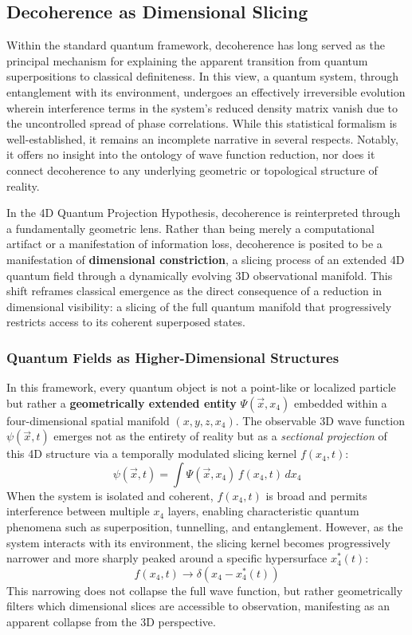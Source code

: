 \documentclass[12pt]{article}
\begin{document}
\subsection{Decoherence as Dimensional Slicing}

Within the standard quantum framework, decoherence has long served as the principal mechanism for explaining the apparent transition from quantum superpositions to classical definiteness. In this view, a quantum system, through entanglement with its environment, undergoes an effectively irreversible evolution wherein interference terms in the system's reduced density matrix vanish due to the uncontrolled spread of phase correlations. While this statistical formalism is well-established, it remains an incomplete narrative in several respects. Notably, it offers no insight into the ontology of wave function reduction, nor does it connect decoherence to any underlying geometric or topological structure of reality. 

In the 4D Quantum Projection Hypothesis, decoherence is reinterpreted through a fundamentally geometric lens. Rather than being merely a computational artifact or a manifestation of information loss, decoherence is posited to be a manifestation of \textbf{dimensional constriction}, a slicing process of an extended 4D quantum field through a dynamically evolving 3D observational manifold. This shift reframes classical emergence as the direct consequence of a reduction in dimensional visibility: a slicing of the full quantum manifold that progressively restricts access to its coherent superposed states.

\subsubsection*{Quantum Fields as Higher-Dimensional Structures}

In this framework, every quantum object is not a point-like or localized particle but rather a \textbf{geometrically extended entity} $\Psi(\vec{x}, x_4)$ embedded within a four-dimensional spatial manifold $(x, y, z, x_4)$. The observable 3D wave function $\psi(\vec{x}, t)$ emerges not as the entirety of reality but as a \emph{sectional projection} of this 4D structure via a temporally modulated slicing kernel $f(x_4, t)$:
\begin{equation}
\psi(\vec{x}, t) = \int \Psi(\vec{x}, x_4) \, f(x_4, t) \, dx_4
\end{equation}
When the system is isolated and coherent, $f(x_4, t)$ is broad and permits interference between multiple $x_4$ layers, enabling characteristic quantum phenomena such as superposition, tunnelling, and entanglement. However, as the system interacts with its environment, the slicing kernel becomes progressively narrower and more sharply peaked around a specific hypersurface $x_4^*(t)$:
\begin{equation}
f(x_4, t) \rightarrow \delta(x_4 - x_4^*(t))
\end{equation}
This narrowing does not collapse the full wave function, but rather geometrically filters which dimensional slices are accessible to observation, manifesting as an apparent collapse from the 3D perspective.
\end{document}
